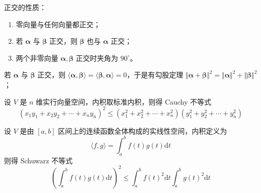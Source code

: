 \begin{remark}
    正交的性质：
    \begin{enumerate}
        \item 零向量与任何向量都正交；
        \item 若 $\bm{\alpha}$ 与 $\bm{\beta}$ 正交，则 $\bm{\beta}$ 也与 $\bm{\alpha}$ 正交；
        \item 两个非零向量 $\bm{\alpha}, \bm{\beta}$ 正交时夹角为 $90^{\circ}$。
    \end{enumerate}
\end{remark}

\begin{remark}
    若 $\bm{\alpha}$ 与 $\bm{\beta}$ 正交，则 $\langle \bm{\alpha}, \bm{\beta} \rangle = \langle \bm{\beta}, \bm{\alpha} \rangle = 0$，于是有勾股定理 ${\Vert \bm{\alpha} + \bm{\beta} \Vert}^{2} = {\Vert \bm{\alpha} \Vert}^{2} + {\Vert \bm{\beta} \Vert}^{2}$；
\end{remark}

\begin{remark}
    设 $V$ 是 $n$ 维实行向量空间，内积取标准内积，则得 Cauchy 不等式
    \[
        (x_{1}y_{1} + x_{2}y_{2} + \cdots + x_{n}y_{n})^{2} \leqslant  (x_{1}^{2} + x_{2}^{2} + \cdots + x_{n}^{2})(y_{1}^{2} + y_{2}^{2} + \cdots + y_{n}^{2})
    \]
\end{remark}

\begin{remark}
    设 $V$ 是由 $[a, b]$ 区间上的连续函数全体构成的实线性空间，内积定义为
    \[
        \langle f, g \rangle = \int_{a}^{b}f(t)g(t)\mathrm{d}t
    \]
    则得 Schuwarz 不等式
    \[
        \left(\int_{a}^{b}f(t)g(t)\mathrm{d}t\right)^{2} \leqslant \int_{a}^{b}f(t)^{2}\mathrm{d}t \int_{a}^{b}g(t)^{2}\mathrm{d}t
    \]
\end{remark}

\section{}







\section{}






